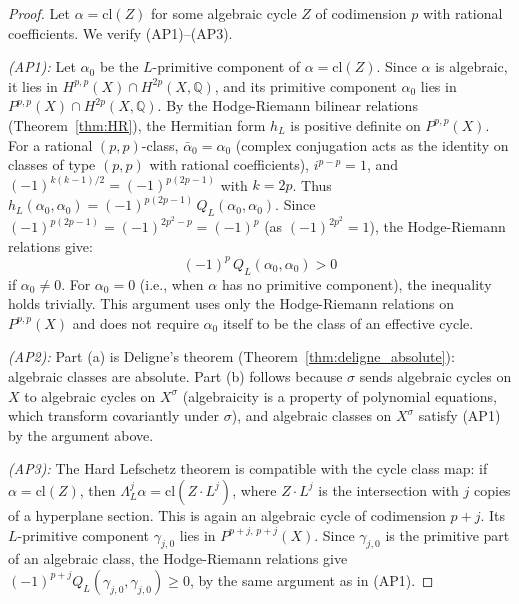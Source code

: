\documentclass[aps,prd,twocolumn,superscriptaddress,nofootinbib]{revtex4-2}
\theoremstyle{definition}
\theoremstyle{remark}
\begin{document}
\begin{proof}
Let $\alpha = \mathrm{cl}(Z)$ for some algebraic cycle $Z$ of codimension $p$ with rational coefficients. We verify (AP1)--(AP3).

\textit{(AP1):} Let $\alpha_0$ be the $L$-primitive component of $\alpha = \mathrm{cl}(Z)$. Since $\alpha$ is algebraic, it lies in $H^{p,p}(X) \cap H^{2p}(X, \mathbb{Q})$, and its primitive component $\alpha_0$ lies in $P^{p,p}(X) \cap H^{2p}(X, \mathbb{Q})$. By the Hodge-Riemann bilinear relations (Theorem~\ref{thm:HR}), the Hermitian form $h_L$ is positive definite on $P^{p,p}(X)$. For a rational $(p,p)$-class, $\bar{\alpha}_0 = \alpha_0$ (complex conjugation acts as the identity on classes of type $(p,p)$ with rational coefficients), $i^{p-p} = 1$, and $(-1)^{k(k-1)/2} = (-1)^{p(2p-1)}$ with $k = 2p$. Thus $h_L(\alpha_0, \alpha_0) = (-1)^{p(2p-1)}\, Q_L(\alpha_0, \alpha_0)$. Since $(-1)^{p(2p-1)} = (-1)^{2p^2 - p} = (-1)^p$ (as $(-1)^{2p^2} = 1$), the Hodge-Riemann relations give:
\begin{equation}
(-1)^p\, Q_L(\alpha_0, \alpha_0) > 0
\end{equation}
if $\alpha_0 \neq 0$. For $\alpha_0 = 0$ (i.e., when $\alpha$ has no primitive component), the inequality holds trivially. This argument uses only the Hodge-Riemann relations on $P^{p,p}(X)$ and does not require $\alpha_0$ itself to be the class of an effective cycle.

\textit{(AP2):} Part (a) is Deligne's theorem (Theorem~\ref{thm:deligne_absolute}): algebraic classes are absolute. Part (b) follows because $\sigma$ sends algebraic cycles on $X$ to algebraic cycles on $X^\sigma$ (algebraicity is a property of polynomial equations, which transform covariantly under $\sigma$), and algebraic classes on $X^\sigma$ satisfy (AP1) by the argument above.

\textit{(AP3):} The Hard Lefschetz theorem is compatible with the cycle class map: if $\alpha = \mathrm{cl}(Z)$, then $\Lambda_L^j \alpha = \mathrm{cl}(Z \cdot L^j)$, where $Z \cdot L^j$ is the intersection with $j$ copies of a hyperplane section. This is again an algebraic cycle of codimension $p + j$. Its $L$-primitive component $\gamma_{j,0}$ lies in $P^{p+j,\,p+j}(X)$. Since $\gamma_{j,0}$ is the primitive part of an algebraic class, the Hodge-Riemann relations give $(-1)^{p+j} Q_L(\gamma_{j,0}, \gamma_{j,0}) \geq 0$, by the same argument as in (AP1).
\end{proof}


\end{document}
